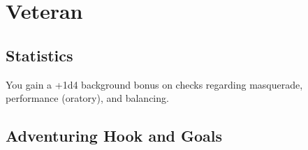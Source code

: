 \section{Veteran}\label{background:veteran}

\subsection{Statistics}
You gain a +1d4 background bonus on checks regarding masquerade, performance (oratory), and balancing.

\subsection{Adventuring Hook and Goals}
